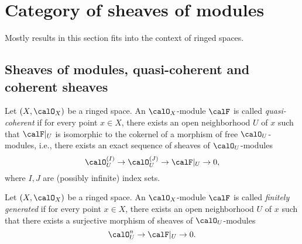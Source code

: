 \section{Category of sheaves of modules}

Mostly results in this section fits into the context of ringed spaces.

\subsection{Sheaves of modules, quasi-coherent and coherent sheaves}



    \begin{definition}\label{def:quasi-coherent_sheaf}
        Let \((X,\calO_X)\) be a ringed space.
        An \(\calO_X\)-module \(\calF\) is called \emph{quasi-coherent} if for every point \(x\in X\), there exists an open neighborhood \(U\) of \(x\) such that \(\calF|_U\) is isomorphic to the cokernel of a morphism of free \(\calO_U\)-modules, i.e., there exists an exact sequence of sheaves of \(\calO_U\)-modules
        \[
            \calO_U^{(I)} \to \calO_U^{(J)} \to \calF|_U \to 0,
        \]
        where \(I,J\) are (possibly infinite) index sets.
    \end{definition}

    \begin{definition}\label{def:finitely_generated_sheaf}
        Let \((X,\calO_X)\) be a ringed space.
        An \(\calO_X\)-module \(\calF\) is called \emph{finitely generated} if for every point \(x\in X\), there exists an open neighborhood \(U\) of \(x\) such that there exists a surjective morphism of sheaves of \(\calO_U\)-modules
        \[
            \calO_U^n \to \calF|_U \to 0.
        \]
    \end{definition}

